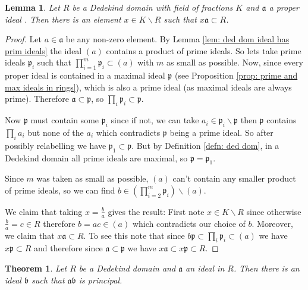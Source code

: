 \documentclass[11pt,a4paper]{report}
\theoremstyle{plain}
\newtheorem{thm}[subsection]{Theorem}
\newtheorem{lem}[subsection]{Lemma}
\theoremstyle{definition}
\theoremstyle{definition}
\def\gothb{\mathfrak{b}}
\def\gothp{\mathfrak{p}}
\def\gotha{\mathfrak{a}}
\begin{document}
\begin{lem}\label{lem: proper ideal mult by frac is still int}
Let $R$ be a Dedekind domain with field of fractions $K$ and $\gotha$ a proper ideal . Then there is an element $x \in K \backslash R$ such that $x \gotha \subset R$.
\end{lem}

\begin{proof}
Let $a \in \gotha$ be any non-zero element. By Lemma \ref{lem: ded dom ideal has prim ideals} the ideal $(a)$ contains a product of prime ideals. So lets take prime ideals $\gothp_i$ such that  $\prod_{i=1}^m \gothp_i \subset (a)$ with $m$ as small as possible. Now, since every proper ideal is contained in a maximal ideal $\gothp$ (see Proposition \ref{prop: prime and max ideals in rings}), which is also a prime ideal (as maximal ideals are always prime). Therefore $\gotha \subset \gothp$, so $\prod_i \gothp_i \subset \gothp$. 

Now $\gothp$ must contain some $\gothp_i$ since if not, we can take $a_i \in \gothp_i \backslash \gothp$ then $\gothp$ contains $\prod_i a_i$ but none of the $a_i$ which contradicts $\gothp$ being a prime ideal. So after possibly relabelling we have $\gothp_1 \subset \gothp$. But by Definition \ref{defn: ded dom}, in a Dedekind domain all prime ideals are maximal, so $\gothp=\gothp_1$.

Since $m$ was taken as small as possible, $(a)$ can't contain any smaller product of prime ideals, so we can find $b \in (\prod_{i=2}^m \gothp_i) \backslash (a)$. 

We claim that taking $x=\frac{b}{a}$ gives the result: First note $x \in K \backslash R$ since otherwise $\frac{b}{a}=c \in R$ therefore $b=ac \in (a)$ which contradicts our choice of $b$. Moreover, we claim that $x \gotha \subset R$. To see this note that since $b \gothp \subset \prod_i \gothp_i \subset (a)$ we have $x \gothp \subset R$ and therefore since $\gotha \subset \gothp$ we have $x\gotha \subset x\gothp \subset R$.



\end{proof}


\begin{thm}\label{thm: ideals are invertible}
Let $R$ be a Dedekind domain and $\gotha$ an ideal in $R$. Then there is an ideal $\gothb$ such that $\gotha \gothb$ is principal.
\end{thm}
\end{document}

